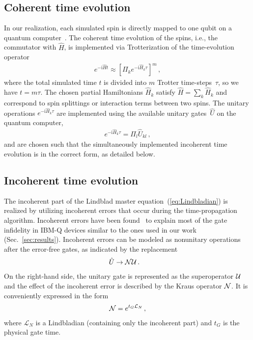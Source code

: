 \documentclass[twocolumn,amsmath,amssymb,pra]{revtex4-2}
\begin{document}
\subsection{Coherent time evolution}\label{sec:time_propagation}
In our realization, 
each simulated spin is directly mapped to one qubit on a quantum computer~\cite{Leppakangas2023}.
The coherent time evolution of the spins, i.e., the commutator with $\hat H$,
is implemented via Trotterization of the time-evolution operator~\cite{Childs2021}
\begin{align}\label{eq:time_propagation}
e^{-\textrm{i} \hat H t} \approx \left[ \Pi_{k} e^{-\textrm{i} \hat H_k \tau} \right]^m  \, ,
\end{align}
where the total simulated time $t$ is divided into $m$ Trotter time-steps~$\tau$, so we have $t=m\tau$.
The chosen partial Hamiltonians $\hat H_k$ satisfy $\hat H=\sum_k \hat H_k$ and correspond to spin splittings or interaction terms between two spins.
The unitary operations $e^{-\textrm{i} \hat H_k \tau}$ are implemented
using the available unitary gates~$\hat U$ on the quantum computer,
\begin{align}\label{eq:gate_decomposition}
e^{-\textrm{i} \hat H_k \tau} = \Pi_l \hat U_{k l}  \, ,
\end{align}
and are chosen such that the simultaneously implemented incoherent time evolution is in the correct form, as detailed below. 

\subsection{Incoherent time evolution}\label{sec:noise_mapping}
The incoherent part of the Lindblad master equation~(\ref{eq:Lindbladian}) is realized by utilizing incoherent errors
that occur during the time-propagation algorithm.
Incoherent errors have been found~\cite{Cattaneo2023} to explain most of the gate infidelity in IBM-Q devices
similar to the ones used in our work (Sec.~\ref{sec:results}). 
Incoherent errors can be modeled as nonunitary operations after the error-free gates,
as indicated by the replacement
\begin{align}\label{eq:noise_insertion}
    \hat U  &\rightarrow  {\cal N} {\cal U} \, .
\end{align}
On the right-hand side, the unitary gate is represented as the superoperator ${\cal U}$
and the effect of the incoherent error is described by the Kraus operator ${\cal N}$.
It is conveniently expressed in the form
\begin{align}\label{eq:noise_as_lindbladian}
{\cal N} = e^{t_{G}\mathcal{L}_{N}} \, ,
\end{align}
where $\mathcal{L}_{N}$ is a Lindbladian (containing only the incoherent part) and $t_G$ is the physical gate time.
\end{document}
